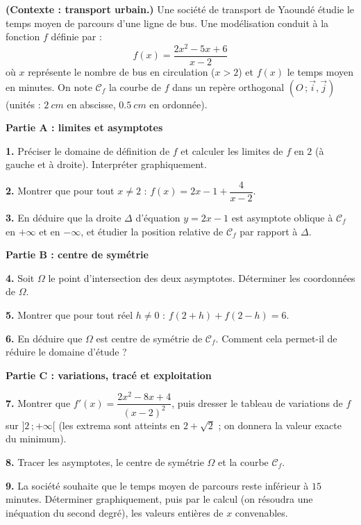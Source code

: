 \documentclass[11pt]{article}
\begin{document}
\begin{exercice}
\textbf{(Contexte : transport urbain.)} Une société de transport de Yaoundé étudie le temps moyen de parcours d'une ligne de bus. Une modélisation conduit à la fonction $f$ définie par :
\[ f(x)=\dfrac{2x^2-5x+6}{x-2} \]
où $x$ représente le nombre de bus en circulation ($x>2$) et $f(x)$ le temps moyen en minutes. On note $\mathcal{C}_f$ la courbe de $f$ dans un repère orthogonal $(O\,;\vec{i},\vec{j})$ (unités : $\SI{2}{cm}$ en abscisse, $\SI{0,5}{cm}$ en ordonnée).

\textbf{Partie A : limites et asymptotes}

\textbf{1.} Préciser le domaine de définition de $f$ et calculer les limites de $f$ en $2$ (à gauche et à droite). Interpréter graphiquement.

\textbf{2.} Montrer que pour tout $x\neq 2$ : $f(x)=2x-1+\dfrac{4}{x-2}$.

\textbf{3.} En déduire que la droite $\Delta$ d'équation $y=2x-1$ est asymptote oblique à $\mathcal{C}_f$ en $+\infty$ et en $-\infty$, et étudier la position relative de $\mathcal{C}_f$ par rapport à $\Delta$.

\textbf{Partie B : centre de symétrie}

\textbf{4.} Soit $\Omega$ le point d'intersection des deux asymptotes. Déterminer les coordonnées de $\Omega$.

\textbf{5.} Montrer que pour tout réel $h\neq 0$ : $f(2+h)+f(2-h)=6$.

\textbf{6.} En déduire que $\Omega$ est centre de symétrie de $\mathcal{C}_f$. Comment cela permet-il de réduire le domaine d'étude ?

\textbf{Partie C : variations, tracé et exploitation}

\textbf{7.} Montrer que $f'(x)=\dfrac{2x^2-8x+4}{(x-2)^2}$, puis dresser le tableau de variations de $f$ sur $]2\,;+\infty[$ (les extrema sont atteints en $2+\sqrt{2}$ ; on donnera la valeur exacte du minimum).

\textbf{8.} Tracer les asymptotes, le centre de symétrie $\Omega$ et la courbe $\mathcal{C}_f$.

\textbf{9.} La société souhaite que le temps moyen de parcours reste inférieur à $15$ minutes. Déterminer graphiquement, puis par le calcul (on résoudra une inéquation du second degré), les valeurs entières de $x$ convenables.
\end{exercice}

\newpage
\end{document}
